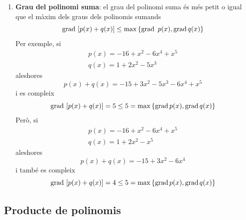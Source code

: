 \begin{enumerate}
\item[(5)] \textbf{Grau del polinomi suma}: el grau del polinomi suma és
més petit o igual que el màxim dels graus dels
polinomis sumands\begin{equation*}
\text{grad\,}\left[ p(x)+q(x)\right] \leq \max \left\{ \text{grad
\,}p(x),\text{grad\,}q(x)\right\}
\end{equation*}Per exemple, si\begin{equation*}
\begin{array}{l}
p(x)=-16+x^{2}-6x^{4}+x^{5} \\
q(x)=1+2x^{2}-5x^{3}\end{array}\end{equation*}aleshores\begin{equation*}
p(x)+q(x)=-15+3x^{2}-5x^{3}-6x^{4}+x^{5}
\end{equation*}i es compleix\begin{equation*}
\text{grad\,}\left[ p(x)+q(x)\right] =5\leq 5=\max
\left\{\text{grad\,}p(x),\text{grad\,}q(x)\right\}
\end{equation*}Però, si\begin{equation*}
\begin{array}{l}
p(x)=-16+x^{2}-6x^{4}+x^{5} \\
q(x)=1+2x^{2}-x^{5}\end{array}\end{equation*}aleshores\begin{equation*}
p(x)+q(x)=-15+3x^{2}-6x^{4}
\end{equation*}i també es compleix\begin{equation*}
\text{grad\,}\left[ p(x)+q(x)\right] =4\leq 5=\max \left\{
\text{grad\,}p(x),\text{grad\,}q(x)\right\}
\end{equation*}
\end{enumerate}

\subsection{Producte de polinomis}

